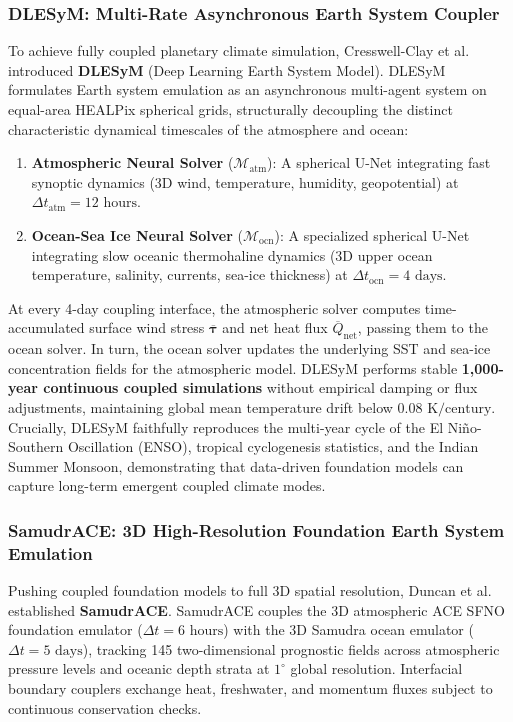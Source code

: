 \subsubsection{DLESyM: Multi-Rate Asynchronous Earth System Coupler}
To achieve fully coupled planetary climate simulation, Cresswell-Clay et al.~\cite{cresswellclay2024dlesym} introduced \textbf{DLESyM} (Deep Learning Earth System Model). DLESyM formulates Earth system emulation as an asynchronous multi-agent system on equal-area HEALPix spherical grids, structurally decoupling the distinct characteristic dynamical timescales of the atmosphere and ocean:
\begin{enumerate}
    \item \textbf{Atmospheric Neural Solver} ($\mathcal{M}_{\text{atm}}$): A spherical U-Net integrating fast synoptic dynamics (3D wind, temperature, humidity, geopotential) at $\Delta t_{\text{atm}} = 12\text{ hours}$.
    \item \textbf{Ocean-Sea Ice Neural Solver} ($\mathcal{M}_{\text{ocn}}$): A specialized spherical U-Net integrating slow oceanic thermohaline dynamics (3D upper ocean temperature, salinity, currents, sea-ice thickness) at $\Delta t_{\text{ocn}} = 4\text{ days}$.
\end{enumerate}
At every 4-day coupling interface, the atmospheric solver computes time-accumulated surface wind stress $\overline{\boldsymbol{\tau}}$ and net heat flux $\overline{Q}_{\text{net}}$, passing them to the ocean solver. In turn, the ocean solver updates the underlying SST and sea-ice concentration fields for the atmospheric model. DLESyM performs stable \textbf{1,000-year continuous coupled simulations} without empirical damping or flux adjustments, maintaining global mean temperature drift below $0.08\text{ K/century}$. Crucially, DLESyM faithfully reproduces the multi-year cycle of the El Ni\~no-Southern Oscillation (ENSO), tropical cyclogenesis statistics, and the Indian Summer Monsoon, demonstrating that data-driven foundation models can capture long-term emergent coupled climate modes.

\subsubsection{SamudrACE: 3D High-Resolution Foundation Earth System Emulation}
Pushing coupled foundation models to full 3D spatial resolution, Duncan et al.~\cite{duncan2025samudrace} established \textbf{SamudrACE}. SamudrACE couples the 3D atmospheric ACE SFNO foundation emulator ($\Delta t = 6\text{ hours}$) with the 3D Samudra ocean emulator ($\Delta t = 5\text{ days}$), tracking 145 two-dimensional prognostic fields across atmospheric pressure levels and oceanic depth strata at $1^\circ$ global resolution. Interfacial boundary couplers exchange heat, freshwater, and momentum fluxes subject to continuous conservation checks.

